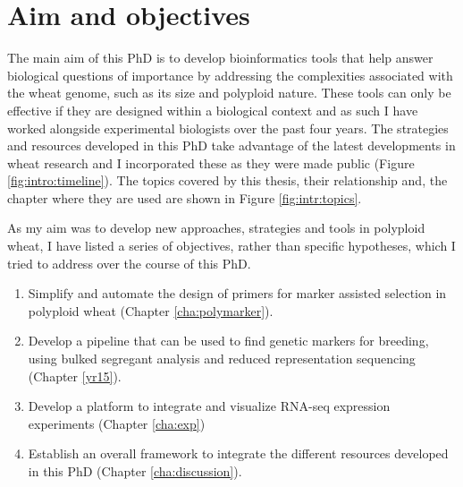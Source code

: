 

\section{Aim and objectives}


The main aim of this PhD is to develop bioinformatics tools that help answer biological questions of importance by addressing the complexities associated with the wheat genome, such as its size and polyploid nature. 
These tools can only be effective if they are designed within a biological context and as such I have worked alongside experimental biologists over the past four years. 
The strategies and resources developed in this PhD take advantage of the latest developments in wheat research and I incorporated these as they were made public (Figure \ref{fig:intro:timeline}). 
The topics covered by this thesis, their relationship and, the chapter where they are used are shown in Figure \ref{fig:intr:topics}.

As my aim was to develop new approaches, strategies and tools in polyploid wheat, I have listed a series of objectives, rather than specific hypotheses, which I tried to address over the course of this PhD. 


\begin{enumerate}

\item Simplify and automate the design of primers for marker assisted selection in polyploid wheat (Chapter \ref{cha:polymarker}).
\item Develop a pipeline that can be used to find genetic markers for breeding, using bulked segregant analysis and reduced representation sequencing  (Chapter \ref{yr15}).
\item Develop a platform to integrate and visualize RNA-seq expression experiments (Chapter \ref{cha:exp})
\item Establish an overall framework to integrate the different resources developed in this PhD (Chapter \ref{cha:discussion}).
\end{enumerate}

